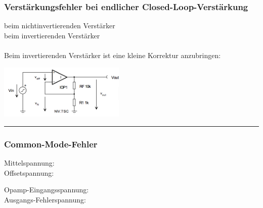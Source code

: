 		\subsubsection{Verstärkungsfehler bei endlicher Closed-Loop-Verstärkung
		}
			\begin{minipage}{12cm}
               	beim nichtinvertierenden Verstärker 
               	\\
               	beim invertierenden Verstärker
               	\hspace{8mm}\\ \\
               	Beim invertierenden Verstärker ist eine kleine Korrektur
               	anzubringen: 
               	\hspace*{10mm}\\
	        \end{minipage}
			\begin{minipage}{6cm}
               	\includegraphics[width=6cm]{./bilder/verstaerkungsfaktor.png}
            \end{minipage}

\hrule

		\subsubsection{Common-Mode-Fehler }
			\begin{minipage}{6cm}
            	Mittelspannung: \\
            	Offsetspannung: 
            \end{minipage}
			\begin{minipage}{12cm}
            	Opamp-Eingangsspannung: \\
            	Ausgangs-Fehlerspannung: \hspace{0.2mm}
            \end{minipage}

